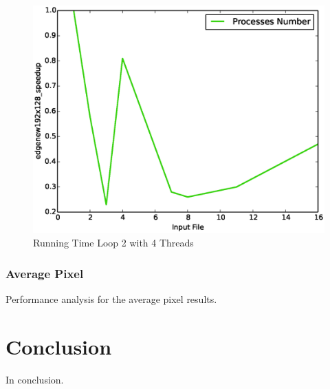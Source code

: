 \documentclass[12pt,a4paper]{article}
\newcommand{\sectionVspacing}{\vspace{15pt}}
\begin{document}
            \begin{figure}[ht]
                \centering
                \includegraphics[scale=0.6]{../graphs/edgenew192x128_speedup.eps}
                \caption{Running Time Loop 2 with 4 Threads}
                \label{loop2-threads4}
            \end{figure}

        \subsubsection{Average Pixel}
            Performance analysis for the average pixel results.

\sectionVspacing

\section{Conclusion}
In conclusion.
\end{document}
